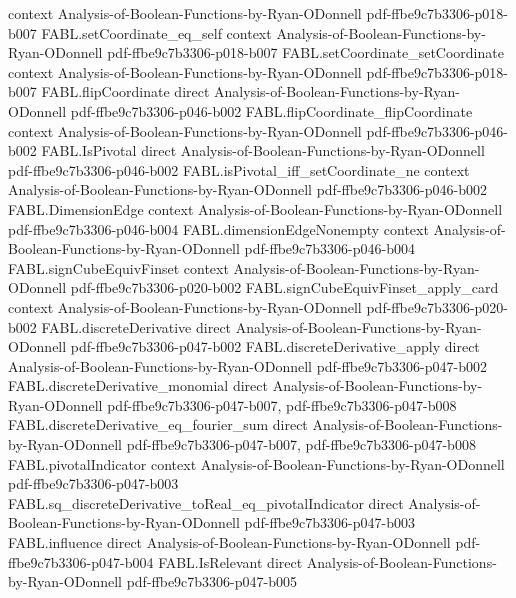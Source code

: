 \begin{theorem}
  {context}
  {Analysis-of-Boolean-Functions-by-Ryan-ODonnell}
  {pdf-ffbe9c7b3306-p018-b007}
\proofstep
  {FABL.setCoordinate_eq_self}
  {context}
  {Analysis-of-Boolean-Functions-by-Ryan-ODonnell}
  {pdf-ffbe9c7b3306-p018-b007}
\proofstep
  {FABL.setCoordinate_setCoordinate}
  {context}
  {Analysis-of-Boolean-Functions-by-Ryan-ODonnell}
  {pdf-ffbe9c7b3306-p018-b007}
\proofstep
  {FABL.flipCoordinate}
  {direct}
  {Analysis-of-Boolean-Functions-by-Ryan-ODonnell}
  {pdf-ffbe9c7b3306-p046-b002}
\proofstep
  {FABL.flipCoordinate_flipCoordinate}
  {context}
  {Analysis-of-Boolean-Functions-by-Ryan-ODonnell}
  {pdf-ffbe9c7b3306-p046-b002}
\proofstep
  {FABL.IsPivotal}
  {direct}
  {Analysis-of-Boolean-Functions-by-Ryan-ODonnell}
  {pdf-ffbe9c7b3306-p046-b002}
\proofstep
  {FABL.isPivotal_iff_setCoordinate_ne}
  {context}
  {Analysis-of-Boolean-Functions-by-Ryan-ODonnell}
  {pdf-ffbe9c7b3306-p046-b002}
\proofstep
  {FABL.DimensionEdge}
  {context}
  {Analysis-of-Boolean-Functions-by-Ryan-ODonnell}
  {pdf-ffbe9c7b3306-p046-b004}
\proofstep
  {FABL.dimensionEdgeNonempty}
  {context}
  {Analysis-of-Boolean-Functions-by-Ryan-ODonnell}
  {pdf-ffbe9c7b3306-p046-b004}
\proofstep
  {FABL.signCubeEquivFinset}
  {context}
  {Analysis-of-Boolean-Functions-by-Ryan-ODonnell}
  {pdf-ffbe9c7b3306-p020-b002}
\proofstep
  {FABL.signCubeEquivFinset_apply_card}
  {context}
  {Analysis-of-Boolean-Functions-by-Ryan-ODonnell}
  {pdf-ffbe9c7b3306-p020-b002}
\proofstep
  {FABL.discreteDerivative}
  {direct}
  {Analysis-of-Boolean-Functions-by-Ryan-ODonnell}
  {pdf-ffbe9c7b3306-p047-b002}
\proofstep
  {FABL.discreteDerivative_apply}
  {direct}
  {Analysis-of-Boolean-Functions-by-Ryan-ODonnell}
  {pdf-ffbe9c7b3306-p047-b002}
\proofstep
  {FABL.discreteDerivative_monomial}
  {direct}
  {Analysis-of-Boolean-Functions-by-Ryan-ODonnell}
  {pdf-ffbe9c7b3306-p047-b007,
    pdf-ffbe9c7b3306-p047-b008}
\proofstep
  {FABL.discreteDerivative_eq_fourier_sum}
  {direct}
  {Analysis-of-Boolean-Functions-by-Ryan-ODonnell}
  {pdf-ffbe9c7b3306-p047-b007,
    pdf-ffbe9c7b3306-p047-b008}
\proofstep
  {FABL.pivotalIndicator}
  {context}
  {Analysis-of-Boolean-Functions-by-Ryan-ODonnell}
  {pdf-ffbe9c7b3306-p047-b003}
\proofstep
  {FABL.sq_discreteDerivative_toReal_eq_pivotalIndicator}
  {direct}
  {Analysis-of-Boolean-Functions-by-Ryan-ODonnell}
  {pdf-ffbe9c7b3306-p047-b003}
\proofstep
  {FABL.influence}
  {direct}
  {Analysis-of-Boolean-Functions-by-Ryan-ODonnell}
  {pdf-ffbe9c7b3306-p047-b004}
\proofstep
  {FABL.IsRelevant}
  {direct}
  {Analysis-of-Boolean-Functions-by-Ryan-ODonnell}
  {pdf-ffbe9c7b3306-p047-b005}

\end{theorem}

